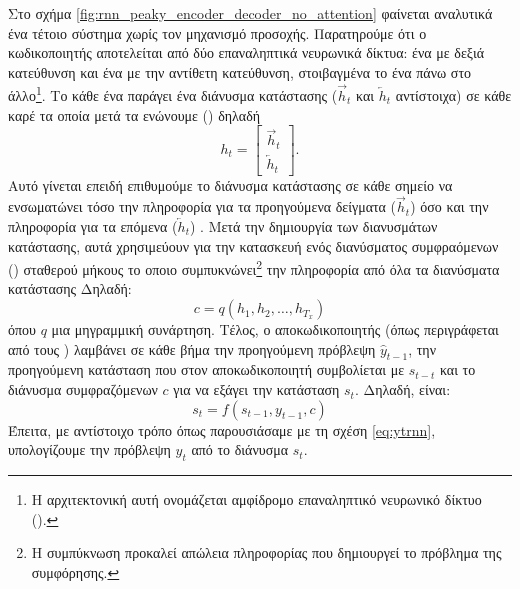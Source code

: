 Στο σχήμα \ref{fig:rnn_peaky_encoder_decoder_no_attention} φαίνεται αναλυτικά ένα τέτοιο σύστημα χωρίς τον μηχανισμό προσοχής. Παρατηρούμε ότι ο κωδικοποιητής αποτελείται από δύο επαναληπτικά νευρωνικά δίκτυα: ένα με δεξιά κατεύθυνση και ένα με την αντίθετη κατεύθυνση, στοιβαγμένα το ένα πάνω στο άλλο\footnote{Η αρχιτεκτονική αυτή ονομάζεται αμφίδρομο επαναληπτικό νευρωνικό δίκτυο ().}\cite{schuster1997bidirectional}. Το κάθε ένα παράγει ένα διάνυσμα κατάστασης ($\overrightarrow{h}_t$ και $\overleftarrow{h}_t$ αντίστοιχα) σε κάθε καρέ τα οποία μετά τα ενώνουμε () δηλαδή 
\[h_t = 
  \begin{bmatrix}
    \overrightarrow{h}_t\\
    \overleftarrow{h}_t
  \end{bmatrix}
.\]
Αυτό γίνεται επειδή επιθυμούμε το διάνυσμα κατάστασης σε κάθε σημείο να ενσωματώνει τόσο την πληροφορία για τα προηγούμενα δείγματα ($\overrightarrow{h}_t$) όσο και την πληροφορία για τα επόμενα ($\overleftarrow{h}_t$) \cite{bahdanau2014neural_machine_translation_attention_begins}. Μετά την δημιουργία των διανυσμάτων κατάστασης, αυτά χρησιμεύουν για την κατασκευή ενός διανύσματος συμφραόμενων () σταθερού μήκους το οποιο συμπυκνώνει\footnote{Η συμπύκνωση προκαλεί απώλεια  πληροφορίας που δημιουργεί το πρόβλημα της συμφόρησης.} την πληροφορία από όλα τα διανύσματα κατάστασης Δηλαδή:
\[
  c = q({h_1, h_2, \dots, h_{T_x}})
\]
όπου $q$ μια μη\textendash γραμμική συνάρτηση. Τέλος, ο αποκωδικοποιητής (όπως περιγράφεται από τους  \cite{bahdanau2014neural_machine_translation_attention_begins}) λαμβάνει σε κάθε βήμα την προηγούμενη πρόβλεψη $\hat{y}_{t-1}$, την προηγούμενη κατάσταση που στον αποκωδικοποιητή συμβολίεται με $s_{t-t}$ και το διάνυσμα συμφραζόμενων $c$ για να εξάγει την κατάσταση $s_t$. Δηλαδή, είναι:
\[
  s_t = f(s_{t-1}, y_{t-1}, c)
\]
Έπειτα, με αντίστοιχο τρόπο όπως παρουσιάσαμε με τη σχέση \ref{eq:ytrnn}, υπολογίζουμε την πρόβλεψη $y_t$ από το διάνυσμα $s_t$.\par

